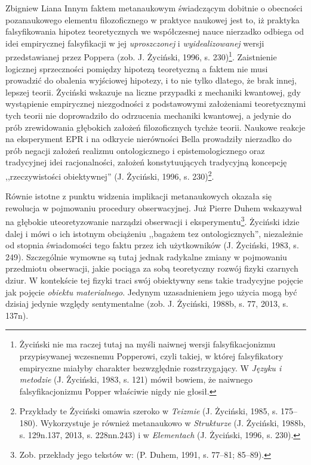 \begin{artplenv}{Zbigniew Liana}
Innym faktem metanaukowym świadczącym dobitnie o obecności pozanaukowego elementu filozoficznego w praktyce naukowej
jest to, iż praktyka falsyfikowania hipotez teoretycznych we współczesnej nauce nierzadko odbiega od idei empirycznej
falsyfikacji w jej \textit{uproszczonej} i \textit{wyidealizowanej} wersji przedstawianej przez Poppera
\label{ref:RNDLar942AozJ}(zob. J. Życiński, 1996, s. 230)\footnote{Życiński nie ma raczej tutaj na myśli naiwnej wersji
	falsyfikacjonizmu przypisywanej wczesnemu Popperowi, czyli takiej, w której falsyfikatory empiryczne miałyby charakter
	bezwzględnie rozstrzygający. W \textit{Języku i metodzie} \label{ref:RNDyLCTuOy1b8}(J. Życiński, 1983, s. 121) mówił
	bowiem, że naiwnego falsyfikacjonizmu Popper właściwie nigdy nie głosił.}. Zaistnienie logicznej sprzeczności pomiędzy
hipotezą teoretyczną a faktem nie musi prowadzić do obalenia wyjściowej hipotezy, i to nie tylko dlatego, że brak
innej, lepszej teorii. Życiński wskazuje na liczne przypadki z mechaniki kwantowej, gdy wystąpienie empirycznej
niezgodności z podstawowymi założeniami teoretycznymi tych teorii nie doprowadziło do odrzucenia mechaniki kwantowej, a
jedynie do prób zrewidowania głębokich założeń filozoficznych tychże teorii. Naukowe reakcje na eksperyment EPR i na
odkrycie nierówności Bella prowadziły nierzadko do prób negacji założeń realizmu ontologicznego i epistemologicznego
oraz tradycyjnej idei racjonalności, założeń konstytuujących tradycyjną koncepcję ,,rzeczywistości obiektywnej''
\label{ref:RND9B582PV6dW}(J. Życiński, 1996, s. 230)\footnote{Przykłady te Życiński omawia szeroko w \textit{Teizmie}
	\label{ref:RNDeDVxzhZtXS}(J. Życiński, 1985, s. 175–180). Wykorzystuje je również metanaukowo w \textit{Strukturze}
	\label{ref:RNDYDcMfhVjkQ}(J. Życiński, 1988b, s. 129n.137, 2013, s. 228nn.243) i w \textit{Elementach}
	\label{ref:RNDMGOXueF4r7}(J. Życiński, 1996, s. 230).}.

Równie istotne z punktu widzenia implikacji metanaukowych okazała się rewolucja w pojmowaniu procedury obserwacyjnej.
Już Pierre Duhem wskazywał na głębokie uteoretyzowanie narządzi obserwacji i eksperymentu\footnote{Zob. przekłady jego
	tekstów w: \label{ref:RND7H3en34uaC}(P. Duhem, 1991, s. 77–81; 85–89).}. Życiński idzie dalej i mówi o ich istotnym
obciążeniu ,,bagażem tez ontologicznych'', niezależnie od stopnia świadomości tego faktu przez ich użytkowników
\label{ref:RND1c8rmkjZxD}(J. Życiński, 1983, s. 249). Szczególnie wymowne są tutaj jednak radykalne zmiany w pojmowaniu
przedmiotu obserwacji, jakie pociąga za sobą teoretyczny rozwój fizyki czarnych dziur. W kontekście tej fizyki traci
swój obiektywny sens takie tradycyjne pojęcie jak pojęcie \textit{obiektu materialnego}. Jedynym uzasadnieniem jego
użycia mogą być dzisiaj jedynie względy sentymentalne \label{ref:RNDdNrJ37wYMr}(zob. J. Życiński, 1988b, s. 77, 2013,
s. 137n).


\end{artplenv}
